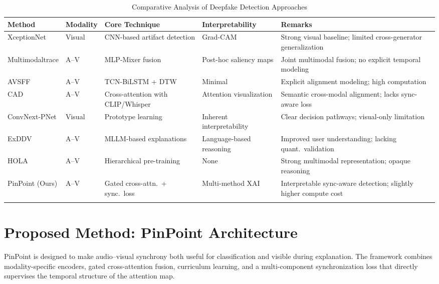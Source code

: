 \documentclass[pdflatex,sn-mathphys-num]{sn-jnl}
\begin{document}
\begin{table}[htbp]
\caption{Comparative Analysis of Deepfake Detection Approaches}\label{tab:comparison}
\scriptsize
\setlength{\tabcolsep}{3pt}
\begin{tabularx}{\textwidth}{@{}p{2.2cm}p{0.9cm}p{2.9cm}p{2.1cm}X@{}}
\toprule
\textbf{Method} & \textbf{Modality} & \textbf{Core Technique} & \textbf{Interpretability} & \textbf{Remarks} \\
\midrule
XceptionNet \cite{ref3} & Visual & CNN-based artifact detection & Grad-CAM & Strong visual baseline; limited cross-generator generalization \\
Multimodaltrace \cite{ref1} & A--V & MLP-Mixer fusion & Post-hoc saliency maps & Joint multimodal fusion; no explicit temporal modeling \\
AVSFF \cite{ref5} & A--V & TCN-BiLSTM + DTW & Minimal & Explicit alignment modeling; high computation \\
CAD \cite{ref7} & A--V & Cross-attention with CLIP/Whisper & Attention visualization & Semantic cross-modal alignment; lacks sync-aware loss \\
ConvNext-PNet \cite{ref18} & Visual & Prototype learning & Inherent interpretability & Clear decision pathways; visual-only limitation \\
ExDDV \cite{ref9} & A--V & MLLM-based explanations & Language-based reasoning & Improved user understanding; lacking quant.\ validation \\
HOLA \cite{ref12} & A--V & Hierarchical pre-training & None & Strong multimodal representation; opaque reasoning \\
PinPoint (Ours) & A--V & Gated cross-attn.\ + sync.\ loss & Multi-method XAI & Interpretable sync-aware detection; slightly higher compute cost \\
\botrule
\end{tabularx}
\end{table}


\section{Proposed Method: PinPoint Architecture}\label{sec3}

PinPoint is designed to make audio--visual synchrony both useful for classification and visible during explanation. The framework combines modality-specific encoders, gated cross-attention fusion, curriculum learning, and a multi-component synchronization loss that directly supervises the temporal structure of the attention map.
\end{document}
